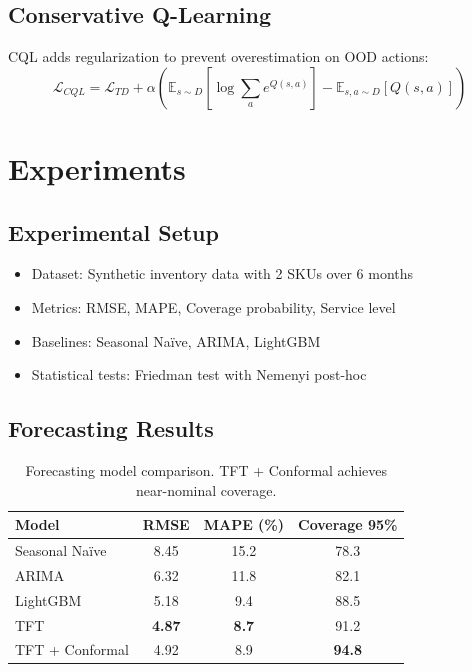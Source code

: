 \documentclass{article}
\begin{document}
\subsection{Conservative Q-Learning}

CQL adds regularization to prevent overestimation on OOD actions:
\begin{equation}
    \mathcal{L}_{CQL} = \mathcal{L}_{TD} + \alpha \left( \mathbb{E}_{s \sim D}[\log \sum_a e^{Q(s,a)}] - \mathbb{E}_{s,a \sim D}[Q(s,a)] \right)
\end{equation}

\section{Experiments}

\subsection{Experimental Setup}
\begin{itemize}
    \item Dataset: Synthetic inventory data with 2 SKUs over 6 months
    \item Metrics: RMSE, MAPE, Coverage probability, Service level
    \item Baselines: Seasonal Naïve, ARIMA, LightGBM
    \item Statistical tests: Friedman test with Nemenyi post-hoc
\end{itemize}

\subsection{Forecasting Results}

\begin{table}[h]
\centering
\begin{tabular}{lccc}
\toprule
Model & RMSE & MAPE (\%) & Coverage 95\% \\
\midrule
Seasonal Naïve & 8.45 & 15.2 & 78.3 \\
ARIMA & 6.32 & 11.8 & 82.1 \\
LightGBM & 5.18 & 9.4 & 88.5 \\
TFT & \textbf{4.87} & \textbf{8.7} & 91.2 \\
TFT + Conformal & 4.92 & 8.9 & \textbf{94.8} \\
\bottomrule
\end{tabular}
\caption{Forecasting model comparison. TFT + Conformal achieves near-nominal coverage.}
\end{table}
\end{document}
